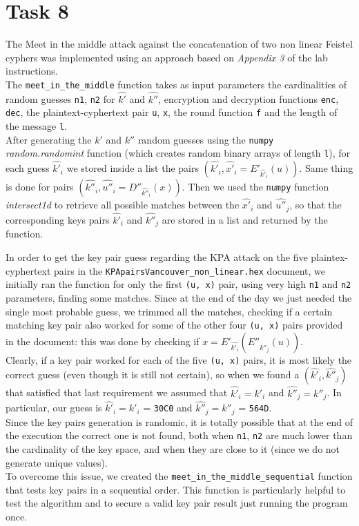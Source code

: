\documentclass{report}
\begin{document}
\section*{Task 8}
The Meet in the middle attack against the concatenation of two non linear Feistel cyphers was implemented using an approach based on \textit{Appendix 3} of the lab instructions.\\
The {\tt meet\_in\_the\_middle} function takes as input parameters the cardinalities of random guesses {\tt n1}, {\tt n2} for $\hat{k'}$ and $\hat{k''}$, encryption and decryption functions {\tt enc}, {\tt dec}, the plaintext-cyphertext pair {\tt u}, {\tt x}, the round function {\tt f} and the length of the message {\tt l}.\\
After generating the $k'$ and $k''$ random guesses using the {\tt numpy} \textit{random.randomint} function (which creates random binary arrays of length {\tt l}), for each guess $\hat{k'}_i$ we stored inside a list the pairs $(\hat{k'}_i, \hat{x'}_i=E'_{\hat{k'}_i}(u))$. Same thing is done for pairs $(\hat{k''}_i, \hat{u''}_i=D''_{\hat{k''}_i}(x))$. Then we used the {\tt numpy} function \textit{intersect1d} to retrieve all possible matches between the $\hat{x'}_i$ and $\hat{u''}_j$, so that the corresponding keys pairs $\hat{k'}_i$ and $\hat{k''}_j$ are stored in a list and returned by the function.

In order to get the key pair guess regarding the KPA attack on the five plaintex-cyphertext pairs in the {\tt KPApairsVancouver\_non\_linear.hex} document, we initially ran the function for only the first {\tt (u, x)} pair, using very high {\tt n1} and {\tt n2} parameters, finding some matches. Since at the end of the day we just needed the single most probable guess, we trimmed all the matches, checking if a certain matching key pair also worked for some of the other four {\tt (u, x)} pairs provided in the document: this was done by checking if  $x = E'_{\hat{k'_i}}(E''_{\hat{k''_j}}(u))$.\\
Clearly, if a key pair worked for each of the five {\tt (u, x)} pairs, it is most likely the correct guess (even though it is still not certain), so when we found a $(\hat{k'}_i, \hat{k''}_j)$ that satisfied that last requirement we assumed that $\hat{k'}_i = k'_i$ and $\hat{k''}_j = k''_j$. In particular, our guess is $\hat{k'}_i = k'_i$ = {\tt 30C0} and $\hat{k''}_j = k''_j$ = {\tt 564D}.\\

Since the key pairs generation is randomic, it is totally possible that at the end of the execution the correct one is not found, both when {\tt n1}, {\tt n2} are much lower than the cardinality of the key space, and when they are close to it (since we do not generate unique values).\\
To overcome this issue, we created the {\tt meet\_in\_the\_middle\_sequential} function that tests key pairs in a sequential order. This function is particularly helpful to test the algorithm and to secure a valid key pair result just running the program once. 
\end{document}

